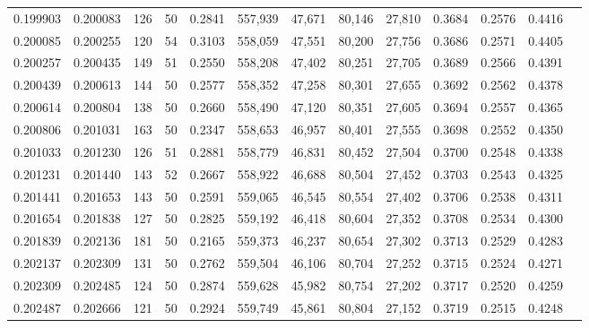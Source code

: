 \begin{tabular}{rrrrrrrrrrrrr}
0.199903 & 0.200083 &   126 &  50 &                                     0.2841 & 557,939 &  47,671 &  80,146 &  27,810 & 0.3684 & 0.2576 & 0.4416 \\
0.200085 & 0.200255 &   120 &  54 &                                     0.3103 & 558,059 &  47,551 &  80,200 &  27,756 & 0.3686 & 0.2571 & 0.4405 \\
0.200257 & 0.200435 &   149 &  51 &                                     0.2550 & 558,208 &  47,402 &  80,251 &  27,705 & 0.3689 & 0.2566 & 0.4391 \\
0.200439 & 0.200613 &   144 &  50 &                                     0.2577 & 558,352 &  47,258 &  80,301 &  27,655 & 0.3692 & 0.2562 & 0.4378 \\
0.200614 & 0.200804 &   138 &  50 &                                     0.2660 & 558,490 &  47,120 &  80,351 &  27,605 & 0.3694 & 0.2557 & 0.4365 \\
0.200806 & 0.201031 &   163 &  50 &                                     0.2347 & 558,653 &  46,957 &  80,401 &  27,555 & 0.3698 & 0.2552 & 0.4350 \\
0.201033 & 0.201230 &   126 &  51 &                                     0.2881 & 558,779 &  46,831 &  80,452 &  27,504 & 0.3700 & 0.2548 & 0.4338 \\
0.201231 & 0.201440 &   143 &  52 &                                     0.2667 & 558,922 &  46,688 &  80,504 &  27,452 & 0.3703 & 0.2543 & 0.4325 \\
0.201441 & 0.201653 &   143 &  50 &                                     0.2591 & 559,065 &  46,545 &  80,554 &  27,402 & 0.3706 & 0.2538 & 0.4311 \\
0.201654 & 0.201838 &   127 &  50 &                                     0.2825 & 559,192 &  46,418 &  80,604 &  27,352 & 0.3708 & 0.2534 & 0.4300 \\
0.201839 & 0.202136 &   181 &  50 &                                     0.2165 & 559,373 &  46,237 &  80,654 &  27,302 & 0.3713 & 0.2529 & 0.4283 \\
0.202137 & 0.202309 &   131 &  50 &                                     0.2762 & 559,504 &  46,106 &  80,704 &  27,252 & 0.3715 & 0.2524 & 0.4271 \\
0.202309 & 0.202485 &   124 &  50 &                                     0.2874 & 559,628 &  45,982 &  80,754 &  27,202 & 0.3717 & 0.2520 & 0.4259 \\
0.202487 & 0.202666 &   121 &  50 &                                     0.2924 & 559,749 &  45,861 &  80,804 &  27,152 & 0.3719 & 0.2515 & 0.4248 \\

\end{tabular}
